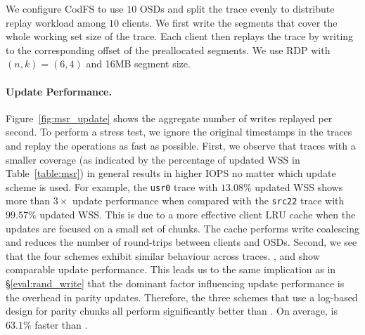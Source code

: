 We configure CodFS to use $10$ OSDs and split the trace evenly to
distribute replay workload among $10$ clients. We first write the segments
that cover the whole working set size of the trace.  Each client then replays
the trace by writing to the corresponding offset of the preallocated segments.
We use RDP \cite{corbett04} with $(n,k)=(6,4)$ and 16MB segment size. 

\paragraph{Update Performance.} Figure~\ref{fig:msr_update} shows the aggregate
number of writes replayed per second. To perform a stress test, we ignore the
original timestamps in the traces and replay the operations as fast as possible.
First, we observe that
traces with a smaller coverage (as indicated by the percentage of updated WSS in
Table~\ref{table:msr}) in general results in higher IOPS no matter which update
scheme is used. For example, the \texttt{usr0} trace with $13.08\%$ updated
WSS shows more than ${3\times}$ update performance when compared with the
\texttt{src22} trace with $99.57\%$ updated WSS.  This
is due to a more effective client LRU cache when the updates are focused on a
small set of chunks. The cache performs write coalescing and reduces the number
of round-trips between clients and OSDs. Second, we see that the four schemes
exhibit similar behaviour across traces. \FL, \PL and \PLR show comparable
update performance.  This leads us to the same implication as in
\S\ref{eval:rand_write} that the dominant factor influencing update performance
is the overhead in parity updates. Therefore, the three schemes that use a
log-based design for parity chunks all perform significantly better than \FO. On
average, \PLR is ${63.1}\%$ faster than \FO.

